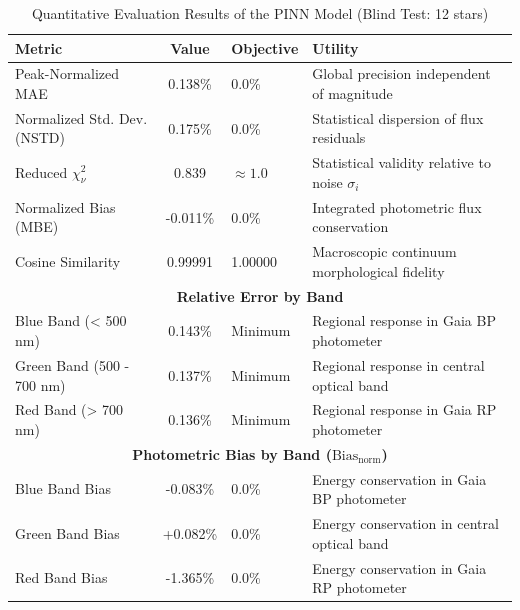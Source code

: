 
\begin{table}[htpb]
\centering
\caption{Quantitative Evaluation Results of the PINN Model (Blind Test: 12 stars)}
\label{tab:pinn_evaluation}
\begin{tabular}{lcll}
\hline
\textbf{Metric} & \textbf{Value} & \textbf{Objective} & \textbf{Utility} \\
\hline
Peak-Normalized MAE & 0.138\% & 0.0\% & Global precision independent of magnitude \\
Normalized Std. Dev. (NSTD) & 0.175\% & 0.0\% & Statistical dispersion of flux residuals \\
Reduced $\chi^2_\nu$ & 0.839 & $\approx 1.0$ & Statistical validity relative to noise $\sigma_i$ \\
Normalized Bias (MBE) & -0.011\% & 0.0\% & Integrated photometric flux conservation \\
Cosine Similarity & 0.99991 & 1.00000 & Macroscopic continuum morphological fidelity \\
\hline
\multicolumn{4}{c}{\textbf{Relative Error by Band}} \\
\hline
Blue Band (< 500 nm) & 0.143\% & Minimum & Regional response in Gaia BP photometer \\
Green Band (500 - 700 nm) & 0.137\% & Minimum & Regional response in central optical band \\
Red Band (> 700 nm) & 0.136\% & Minimum & Regional response in Gaia RP photometer \\
\hline
\multicolumn{4}{c}{\textbf{Photometric Bias by Band ($\text{Bias}_{\text{norm}}$)}} \\
\hline
Blue Band Bias & -0.083\% & 0.0\% & Energy conservation in Gaia BP photometer \\
Green Band Bias & +0.082\% & 0.0\% & Energy conservation in central optical band \\
Red Band Bias & -1.365\% & 0.0\% & Energy conservation in Gaia RP photometer \\
\hline
\end{tabular}
\end{table}
